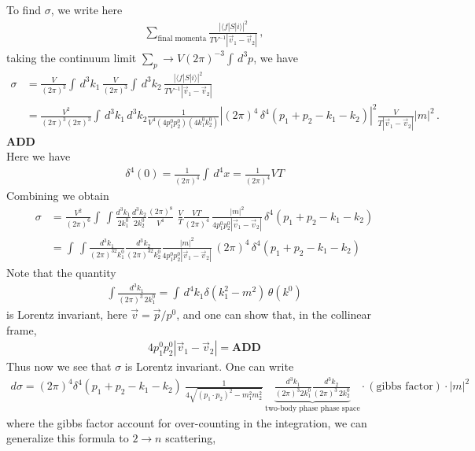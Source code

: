 \documentclass[11pt, onesided]{book}
\theoremstyle{break}
\theoremstyle{break}
\begin{document}
To find $\sigma$, we write here
\begin{align*}
\sum_{\text{final momenta}} \frac{|\langle f |S | i\rangle|^2}{TV^{-1}|\vec{v}_1 - \vec{v}_2|}\,,
\end{align*}
taking the continuum limit $\sum_p \to V(2\pi)^{-3}\int \, d^3p$, we have
\begin{align*}
\sigma &= \frac{V}{(2\pi)^3}\int\, d^3k_1 \, \frac{V}{(2\pi)^3}\int \, d^3k_2 \, \frac{|\langle f|S|i\rangle|^2}{TV^{-1}|\vec{v}_1 - \vec{v}_2|}\\
&= \frac{V^2}{(2\pi)^3(2\pi)^3}\int \, d^3k_1\, d^3k_2 \frac{1}{V^4(4p_1^0 p_2^0)(4k_1^0k_2^0)}\left|(2\pi)^4 \, \delta^4(p_1 + p_2 -k_1-k_2)\right|^2 \frac{V}{T|\vec{v}_1 - \vec{v}_2|}|m|^2\,.
\end{align*}
\textbf{ADD}\\
Here we have
\begin{align*}
\delta^4(0) = \frac{1}{(2\pi)^4}\int\, d^4 x = \frac{1}{(2\pi)^4}VT
\end{align*}
Combining we obtain
\begin{align*}
\sigma 
&= \frac{V^2}{(2\pi)^6}\int\, \int 
\frac{d^3k_1}{2k_1^0}\frac{d^3k_2}{2k_2^0}
\frac{(2\pi)^8}{V^4}  \,  \, \frac{V}{T}\frac{VT}{(2\pi)^4}\, \frac{|m|^2}{4p_1^0p_2^0|\vec{v}_1 - \vec{v}_2|}\, \delta^4(p_1+p_2 -k_1-k_2)\\
&= \int\, \int \frac{d^3k_1}{(2\pi)^32k_1^0}\frac{d^3k_2}{(2\pi)^32k_2^0}
 \frac{|m|^2}{4p_1^0p_2^0|\vec{v}_1 - \vec{v}_2|}\, (2\pi)^4 \, \delta^4(p_1+p_2 -k_1-k_2)
\end{align*}
Note that the quantity
\begin{align*}
\int \frac{d^3k_1}{(2\pi)^3\, 2k_1^0} = \int\, d^4k_1 \delta(k_1^2 -m^2) \, \theta(k^0)
\end{align*}
is Lorentz invariant, here $\vec{v} = \vec{p}/p^0$, and one can show that, in the collinear frame, 
\begin{align*}
4p_1^0 p_2^0 |\vec{v}_1 -\vec{v}_2| = \textbf{ADD}
\end{align*}
Thus now we see that $\sigma$ is Lorentz invariant. One can write
\begin{align*}
d\sigma = (2\pi)^4 \delta^4(p_1 +p_2 -k_1-k_2) \ \frac{1}{4\sqrt{(p_1\cdot p_2)^2 - m_1^2m_2^2}} \, \underbrace{\frac{d^3k_1}{(2\pi)^3 2k_1^0}\frac{d^3k_2}{(2\pi)^3 \, 2k_2^0}}_{\text{two-body phase phase space}} \cdot (\text{gibbs factor})\cdot |m|^2
\end{align*}
where the gibbs factor account for over-counting in the integration, we can generalize this formula to $2\to n$ scattering, 
\end{document}
